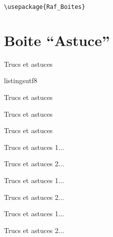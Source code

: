 \documentclass[a4paper,12pt]{article}
\begin{document}
		\begin{lstlisting}
\usepackage{Raf_Boites}
		\end{lstlisting}



	\section{Boite ``Astuce''}

\begin{code}%
\begin{astuce}
	Trucs et astuces
\end{astuce}listingsutf8
\end{code}

\begin{astuce}
	Trucs et astuces
\end{astuce}%

\begin{code}%
\begin{astuce*}
	Trucs et astuces
\end{astuce*}
\end{code}

\begin{astuce*}
	Trucs et astuces
\end{astuce*}%

\begin{code}%
\begin{astuces}
	\item Trucs et astuces 1...
	\item Trucs et astuces 2...
\end{astuces}
\end{code}

\begin{astuces}
	\item Trucs et astuces 1...
	\item Trucs et astuces 2...
\end{astuces}%

\begin{code}%
\begin{astuces*}
	\item Trucs et astuces 1...
	\item Trucs et astuces 2...
\end{astuces*}
\end{code}
\end{document}
